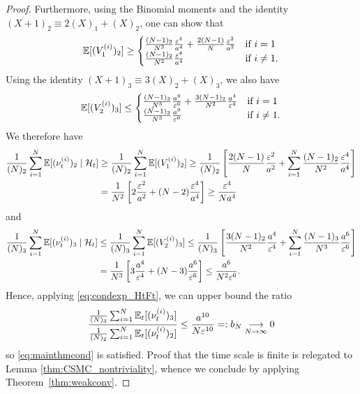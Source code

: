 \begin{proof}
Furthermore, using the Binomial moments and the identity $(X+1)_2 \equiv 2(X)_1 +(X)_2$, one can show that
\begin{equation*}
\mathbb{E}[ (V_1^{(i)} )_2 ]
\geq \begin{cases}
\frac{(N-1)_2}{N^2}\frac{\varepsilon^4}{a^4} 
        + \frac{2(N-1)}{N} \frac{\varepsilon^2}{a^2} &\text{if } i=1 \\
\frac{(N-1)_2}{N^2}\frac{\varepsilon^4}{a^4} &\text{if } i\neq 1 .
\end{cases}
\end{equation*}
Using the identity $(X+1)_3 \equiv 3(X)_2 +(X)_3$, we also have
\begin{equation*}
\mathbb{E}[ (V_2^{(i)} )_3 ]
\leq \begin{cases}
\frac{(N-1)_3}{N^3}\frac{a^6}{\varepsilon^6} 
        + \frac{3(N-1)_2}{N^2} \frac{a^4}{\varepsilon^4} &\text{if } i=1 \\
\frac{(N-1)_3}{N^3}\frac{a^6}{\varepsilon^6}  &\text{if } i\neq 1 .
\end{cases}
\end{equation*}
We therefore have
\begin{align}
\frac{1}{(N)_2} \sum_{i=1}^N \mathbb{E}[ (\nu_t^{(i)})_2 \mid \mathcal{H}_t ]
&\geq \frac{1}{(N)_2} \sum_{i=1}^N \mathbb{E}[ ( V_1^{(i)} )_2 ]
\geq \frac{1}{(N)_2} \left[ \frac{2(N-1)}{N} \frac{\varepsilon^2}{a^2}
        + \sum_{i=1}^N \frac{(N-1)_2}{N^2}\frac{\varepsilon^4}{a^4} \right] \notag\\
&= \frac{1}{N^2} \left[ 2 \frac{\varepsilon^2}{a^2} 
        + (N-2) \frac{\varepsilon^4}{a^4} \right]
   \geq \frac{\varepsilon^4}{Na^4} \label{eq:csmc_cN_LB}
\end{align}
and
\begin{align*}
\frac{1}{(N)_3} \sum_{i=1}^N \mathbb{E}[ (\nu_t^{(i)})_3 \mid \mathcal{H}_t ]
&\leq \frac{1}{(N)_3} \sum_{i=1}^N \mathbb{E}[ ( V_2^{(i)} )_3 ]
\leq \frac{1}{(N)_3} \left[ \frac{3(N-1)_2}{N^2} \frac{a^4}{\varepsilon^4}
        + \sum_{i=1}^N \frac{(N-1)_3}{N^3}\frac{a^6}{\varepsilon^6}  \right] \\
&= \frac{1}{N^3} \left[ 3 \frac{a^4}{\varepsilon^4} 
        + (N-3) \frac{a^6}{\varepsilon^6} \right]
    \leq \frac{a^6}{N^2 \varepsilon^6} .
\end{align*}
Hence, applying \eqref{eq:condexp_HtFt}, we can upper bound the ratio
\begin{equation*}
\frac{\frac{1}{(N)_3} \sum_{i=1}^N \mathbb{E}_t[ (\nu_t^{(i)})_3 ]}{\frac{1}{(N)_2} 
        \sum_{i=1}^N \mathbb{E}_t[ (\nu_t^{(i)})_2 ]}
\leq \frac{a^{10}}{N\varepsilon^{10}}
=: b_N 
\underset{N\to\infty}{\longrightarrow} 0
\end{equation*}
so \eqref{eq:mainthmcond} is satisfied. 
Proof that the time scale is finite is relegated to Lemma \ref{thm:CSMC_nontriviality}, whence we conclude by applying Theorem~\ref{thm:weakconv}.


\end{proof}
